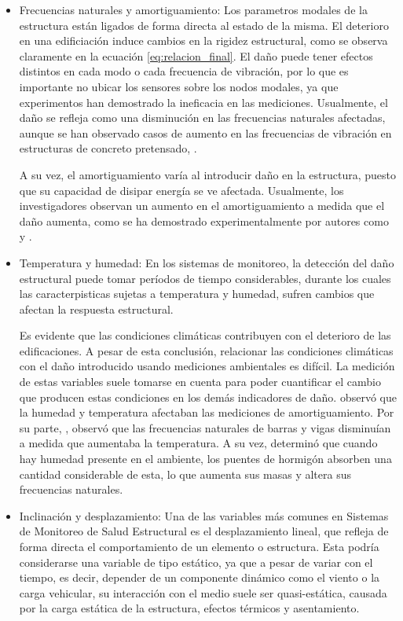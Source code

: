     \begin{itemize}
        \item Frecuencias naturales y amortiguamiento: Los parametros modales de la estructura están ligados de forma directa al estado de la misma. El deterioro en una edificiación induce cambios en la rigidez estructural, como se observa claramente en la ecuación \ref{eq:relacion_final}. El daño puede tener efectos distintos en cada modo o cada frecuencia de vibración, por lo que es importante no ubicar los sensores sobre los nodos modales, ya que experimentos han demostrado la ineficacia en las mediciones. Usualmente, el daño se refleja como una disminución en las frecuencias naturales afectadas, aunque se han observado casos de aumento en las frecuencias de vibración en estructuras de concreto pretensado, \citep{rytter1993vibration}.
        
        A su vez, el amortiguamiento varía al introducir daño en la estructura, puesto que su capacidad de disipar energía se ve afectada. Usualmente, los investigadores observan un aumento en el amortiguamiento a medida que el daño aumenta, como se ha demostrado experimentalmente por autores como \citet{hearn1991modal} y \citet{rytter1993vibration}.

        \item Temperatura y humedad: En los sistemas de monitoreo, la detección del daño estructural puede tomar períodos de tiempo considerables, durante los cuales las caracterpisticas sujetas a temperatura y humedad, sufren cambios que afectan la respuesta estructural.
                
        Es evidente que las condiciones climáticas contribuyen con el deterioro de las edificaciones. A pesar de esta conclusión, relacionar las condiciones climáticas con el daño introducido usando mediciones ambientales es difícil. La medición de estas variables suele tomarse en cuenta para poder cuantificar el cambio que producen estas condiciones en los demás indicadores de daño. \citet{rytter1993vibration} observó que la humedad y temperatura afectaban las mediciones de amortiguamiento. Por su parte, \citet{mohamed2014}, observó que las frecuencias naturales de barras y vigas disminuían a medida que aumentaba la temperatura. A su vez, \citet{sohn2007effects} determinó que cuando hay humedad presente en el ambiente, los puentes de hormigón absorben una cantidad considerable de esta, lo que aumenta sus masas y altera sus frecuencias naturales.
        
        \item Inclinación y desplazamiento: Una de las variables más comunes en Sistemas de Monitoreo de Salud Estructural es el desplazamiento lineal, que refleja de forma directa el comportamiento de un elemento o estructura. Esta podría considerarse una variable de tipo estático, ya que a pesar de variar con el tiempo, es decir, depender de un componente dinámico como el viento o la carga vehicular, su interacción con el medio suele ser quasi-estática, causada por la carga estática de la estructura, efectos térmicos y asentamiento.
        

\end{itemize}
